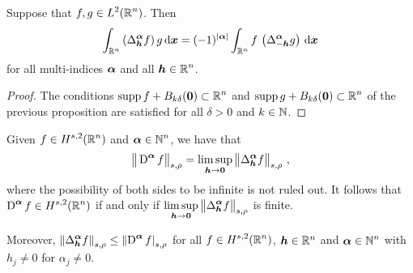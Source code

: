 \begin{cor}
Suppose that $\displaystyle f,g \in L^2(\mathbb{R}^n)$.  Then
\[
\int_{\mathbb{R}^n} \left(\Delta^{{\bm{\alpha}}}_{{\bm{h}}} f\right) g \,\mathrm{d}{{\bm{x}}}
= (-1)^{|{\bm{\alpha}}|}
\int_{\mathbb{R}^n} f\,\left(\Delta^{{\bm{\alpha}}}_{-{\bm{h}}} g\right) \,\mathrm{d}{{\bm{x}}}
\]
for all multi-indices ${\bm{\alpha}}$ and all $\displaystyle {\bm{h}} \in \mathbb{R}^n$.
\end{cor}

\begin{proof}
The conditions $\displaystyle \operatorname{supp} f + B_{k\delta}({\bm{0}}) \subset \mathbb{R}^n$ and
$\displaystyle \operatorname{supp} g + B_{k\delta}({\bm{0}}) \subset \mathbb{R}^n$ of the previous
proposition are satisfied for all $\delta>0$ and $k \in \mathbb{N}$.
\end{proof}

\begin{prop} \label{ell_reg_prop3}
Given $\displaystyle f\in H^{s,2}(\mathbb{R}^n)$ and
$\displaystyle {\bm{\alpha}} \in \mathbb{N}^n$, we have that
\begin{equation} \label{ellRegProp3Eq1}
\big\|\operatorname{D}^{{\bm{\alpha}}} f\big\|_{s,\rho} = \limsup_{{\bm{h}}\rightarrow {\bm{0}}}
\big\|\Delta^{{\bm{\alpha}}}_{{\bm{h}}} f\big\|_{s,\rho} \ ,
\end{equation}
where the possibility of both sides to be infinite is not ruled out.
It follows that $\displaystyle \operatorname{D}^{{\bm{\alpha}}} f \in H^{s,2}(\mathbb{R}^n)$
if and only if $\displaystyle \limsup_{{\bm{h}}\rightarrow {\bm{0}}}
\big\|\Delta^{{\bm{\alpha}}}_{{\bm{h}}} f\big\|_{s,\rho}$ is finite.

Moreover,
$\displaystyle \left\| \Delta^{{\bm{\alpha}}}_{{\bm{h}}} f  \right\|_{s,\rho}
\leq \left\| \operatorname{D}^{{\bm{\alpha}}} f\right|_{s,\rho}$ for all
$\displaystyle f\in H^{s,2}(\mathbb{R}^n)$, ${\bm{h}} \in \mathbb{R}^n$ and
$\displaystyle {\bm{\alpha}} \in \mathbb{N}^n$ with $h_j \neq 0$ for $\alpha_j \neq 0$.
\end{prop}

